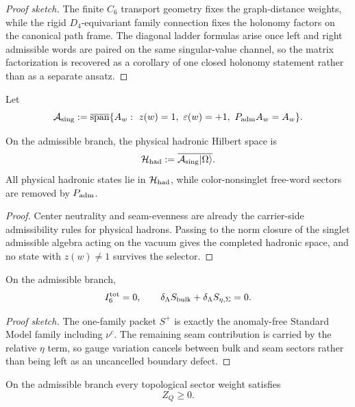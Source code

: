 \begin{proof}[Proof sketch]
The finite $C_6$ transport geometry fixes the graph-distance weights, while the rigid
$D_4$-equivariant family connection fixes the holonomy factors on the canonical path frame. The
diagonal ladder formulas arise once left and right admissible words are paired on the same
singular-value channel, so the matrix factorization is recovered as a corollary of one closed
holonomy statement rather than as a separate ansatz.
\end{proof}

\begin{definition}
Let
\[
\mathcal A_{\mathrm{sing}}
:=
\overline{\mathrm{span}}\{A_w:\ z(w)=1,\ \varepsilon(w)=+1,\ P_{\mathrm{adm}} A_w=A_w\}.
\]
\end{definition}

\begin{theorem}
On the admissible branch, the physical hadronic Hilbert space is
\[
\mathcal H_{\mathrm{had}}:=\overline{\mathcal A_{\mathrm{sing}}|\Omega\rangle}.
\]
All physical hadronic states lie in $\mathcal H_{\mathrm{had}}$, while color-nonsinglet free-word sectors are removed by $P_{\mathrm{adm}}$.
\end{theorem}

\begin{proof}
Center neutrality and seam-evenness are already the carrier-side admissibility rules for physical hadrons. Passing to the norm closure of the singlet admissible algebra acting on the vacuum gives the completed hadronic space, and no state with $z(w)\neq 1$ survives the selector.
\end{proof}

\begin{theorem}
On the admissible branch,
\[
I_6^{\mathrm{tot}}=0,
\qquad
\delta_\Lambda S_{\mathrm{bulk}}+\delta_\Lambda S_{\eta,\Sigma}=0.
\]
\end{theorem}

\begin{proof}[Proof sketch]
The one-family packet $S^+$ is exactly the anomaly-free Standard Model family including $\nu^c$. The remaining seam contribution is carried by the relative $\eta$ term, so gauge variation cancels between bulk and seam sectors rather than being left as an uncancelled boundary defect.
\end{proof}

\begin{lemma}
\label{lem:topological-sector-positivity}
On the admissible branch every topological sector weight satisfies
\[
Z_Q\ge 0.
\]
\end{lemma}

